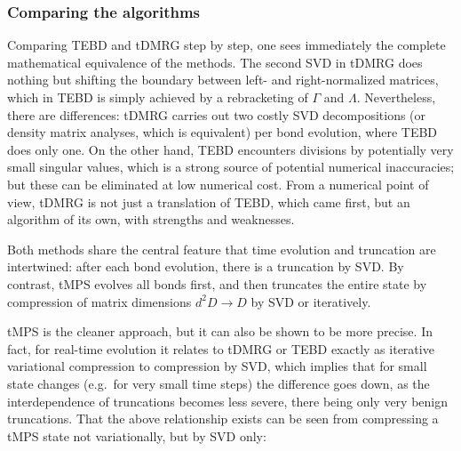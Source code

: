 \documentclass[a4paper,10pt,oneside,onecolumn,1p,times]{elsarticle}
\begin{document}
\subsubsection{Comparing the algorithms}
Comparing TEBD and tDMRG step by step, one sees immediately the complete mathematical equivalence of the methods. The second SVD in tDMRG does nothing but shifting the boundary between left- and right-normalized matrices, which in TEBD is simply achieved by a rebracketing of $\Gamma$ and $\Lambda$. Nevertheless, there are differences: tDMRG carries out two costly SVD decompositions (or density matrix analyses, which is equivalent) per bond evolution, where TEBD does only one. On the other hand, TEBD encounters divisions by potentially very small singular values, which is a strong source of potential numerical inaccuracies; but these can be eliminated \cite{Hastings09} at low numerical cost. From a numerical point of view, tDMRG is not just a translation of TEBD, which came first, but an algorithm of its own, with strengths and weaknesses.

Both methods share the central feature that time evolution and truncation are intertwined: after each bond evolution, there is a truncation by SVD. By contrast, tMPS evolves all bonds first, and then truncates the entire state by compression of matrix dimensions $d^2 D \rightarrow D$ by SVD or iteratively. 

tMPS is the cleaner approach, but it can also be shown to be more precise. In fact, for real-time evolution it relates to tDMRG or TEBD exactly as iterative variational compression to compression by SVD, which implies that for small state changes (e.g.\ for very small time steps) the difference goes down, as the interdependence of truncations becomes less severe, there being only very benign truncations. That the above relationship exists can be seen from compressing a tMPS state not variationally, but by SVD only: 
\end{document}
